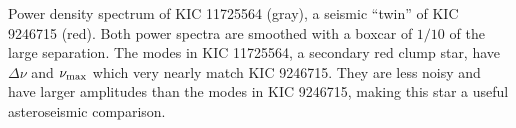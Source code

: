\label{fig:twin}
Power density spectrum of KIC 11725564 (gray), a seismic ``twin'' of KIC 9246715 (red). Both power spectra are smoothed with a boxcar of $1/10$ of the large separation. The modes in KIC 11725564, a secondary red clump star, have $\Delta \nu$ and $\nu_{\rm{max}}$ which very nearly match KIC 9246715. They are less noisy and have larger amplitudes than the modes in KIC 9246715, making this star a useful asteroseismic comparison.